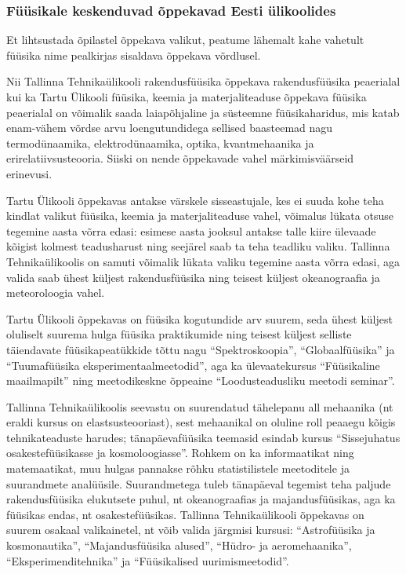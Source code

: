 \documentclass[11pt]{article}
\begin{document}
{{\subsubsection*{Füüsikale keskenduvad õppekavad Eesti ülikoolides}
Et lihtsustada õpilastel õppekava valikut, peatume lähemalt kahe vahetult füüsika nime pealkirjas sisaldava õppekava võrdlusel.

Nii Tallinna Tehnikaülikooli rakendusfüüsika õppekava rakendusfüüsika peaerialal kui ka Tartu Ülikooli füüsika, keemia ja materjaliteaduse õppekava füüsika
peaerialal on võimalik saada laiapõhjaline ja süsteemne füüsikaharidus, mis katab
enam-vähem võrdse arvu loengutundidega sellised baasteemad nagu termodünaamika, elektrodünaamika, optika,
kvantmehaanika ja erirelatiivsusteooria. Siiski on nende õppekavade vahel märkimisväärseid erinevusi.

Tartu Ülikooli õppekavas antakse värskele sisseastujale, kes ei suuda kohe teha kindlat valikut füüsika, keemia
ja materjaliteaduse vahel, võimalus lükata otsuse tegemine aasta võrra edasi: esimese aasta jooksul antakse talle
kiire ülevaade kõigist kolmest teadusharust ning seejärel saab ta teha teadliku valiku.
Tallinna Tehnikaülikoolis on samuti võimalik lükata valiku tegemine aasta võrra edasi, aga valida saab ühest küljest
rakendusfüüsika ning teisest küljest okeanograafia ja meteoroloogia vahel.

Tartu Ülikooli õppekavas on füüsika kogutundide arv suurem, seda ühest
küljest oluliselt suurema hulga füüsika praktikumide
ning teisest küljest selliste täiendavate füüsikapeatükkide tõttu nagu
``Spektroskoopia'', ``Globaalfüüsika''
ja ``Tuumafüüsika eksperimentaalmeetodid'', aga ka ülevaatekursus
``Füüsikaline maailmapilt'' ning meetodikeskne
õppeaine ``Loodusteadusliku meetodi seminar''.

Tallinna Tehnikaülikoolis seevastu on  suurendatud tähelepanu all
mehaanika (nt eraldi kursus on elastsusteooriast),
sest mehaanikal on oluline roll peaaegu kõigis tehnikateaduste
harudes; tänapäevafüüsika teemasid esindab kursus ``Sissejuhatus
osakestefüüsikasse ja kosmoloogiasse''. Rohkem on ka informaatikat ning
matemaatikat, muu hulgas pannakse rõhku statistilistele meetoditele ja
suurandmete analüüsile. Suurandmetega tuleb tänapäeval tegemist teha
paljude
rakendusfüüsika elukutsete puhul, nt okeanograafias ja majandusfüüsikas,
aga ka füüsikas endas, nt osakestefüüsikas.
Tallinna Tehnikaülikooli õppekavas on suurem osakaal valikainetel, nt
võib valida järgmisi kursusi:
``Astrofüüsika ja kosmonautika'', ``Majandusfüüsika alused'', ``Hüdro-
ja aeromehaanika'', ``Eksperimenditehnika'' ja
``Füüsikalised uurimismeetodid''.

}}
\end{document}

